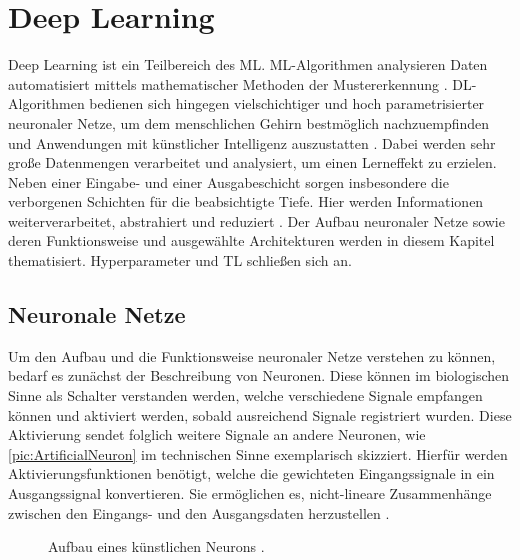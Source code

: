 \chapter{Deep Learning}
\thispagestyle{fancy}
\label{chap:Deep Learning}

\noindent
Deep Learning ist ein Teilbereich des \ac{ML}. \ac{ML}-Algorithmen analysieren Daten automatisiert mittels mathematischer Methoden der Mustererkennung \cite[S.~455-457]{KHA19}. \ac{DL}-Algorithmen bedienen sich hingegen vielschichtiger und hoch parametrisierter neuronaler Netze, um dem menschlichen Gehirn bestmöglich nachzuempfinden und Anwendungen mit künstlicher Intelligenz auszustatten \cite[S.~1-2]{GOO16}. Dabei werden sehr große Datenmengen verarbeitet und analysiert, um einen Lerneffekt zu erzielen. Neben einer Eingabe- und einer Ausgabeschicht sorgen insbesondere die verborgenen Schichten für die beabsichtigte Tiefe. Hier werden Informationen weiterverarbeitet, abstrahiert und reduziert \cite[S.~164-165]{GOO16}. Der Aufbau neuronaler Netze sowie deren Funktionsweise und ausgewählte Architekturen werden in diesem Kapitel thematisiert. Hyperparameter und \ac{TL} schließen sich an.


\section{Neuronale Netze}
\noindent
Um den Aufbau und die Funktionsweise neuronaler Netze verstehen zu können, bedarf es zunächst der Beschreibung von Neuronen. Diese können im biologischen Sinne als Schalter verstanden werden, welche verschiedene Signale empfangen können und aktiviert werden, sobald ausreichend Signale registriert wurden. Diese Aktivierung sendet folglich weitere Signale an andere Neuronen, wie \autoref{pic:ArtificialNeuron} im technischen Sinne exemplarisch skizziert. Hierfür werden Aktivierungsfunktionen benötigt, welche die gewichteten Eingangssignale in ein Ausgangssignal konvertieren. Sie ermöglichen es, nicht-lineare Zusammenhänge zwischen den Eingangs- und den Ausgangsdaten herzustellen \cite[S.~134]{ZHA20}.
\newpage

\begin{figure}[h!]
  \centering
  \caption{Aufbau eines künstlichen Neurons \cite{MCC20}.}
  \label{pic:ArtificialNeuron}
\end{figure}

